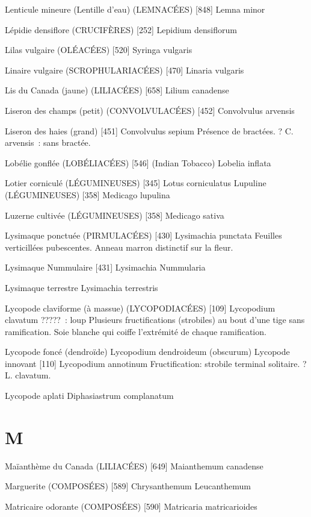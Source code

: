 Lenticule mineure (Lentille d’eau) (LEMNACÉES)  [848]
				Lemna minor


Lépidie densiflore (CRUCIFÈRES)  [252]
				Lepidium densiflorum

Lilas vulgaire (OLÉACÉES)  [520]
				Syringa vulgaris

Linaire vulgaire (SCROPHULARIACÉES)  [470]
				Linaria vulgaris

Lis du Canada (jaune) (LILIACÉES)  [658]
				Lilium canadense

Liseron des champs (petit) (CONVOLVULACÉES)  [452]
				Convolvulus arvensis

Liseron des haies (grand)  [451]
				Convolvulus sepium
Présence de bractées. ? C. arvensis : sans bractée.

Lobélie gonflée (LOBÉLIACÉES)  [546] (Indian Tobacco)
				Lobelia inflata

Lotier corniculé (LÉGUMINEUSES)  [345]
				Lotus corniculatus
Lupuline (LÉGUMINEUSES)  [358]
				Medicago lupulina

Luzerne cultivée (LÉGUMINEUSES)  [358]
				Medicago sativa

Lysimaque ponctuée (PIRMULACÉES)  [430]
				Lysimachia punctata
Feuilles verticillées pubescentes.
Anneau marron distinctif sur la fleur.

Lysimaque Nummulaire  [431]
				Lysimachia Nummularia

Lysimaque terrestre
				Lysimachia terrestris

Lycopode claviforme (à massue) (LYCOPODIACÉES)  [109]
				Lycopodium clavatum
????? : loup
Plusieurs fructifications (strobiles) au bout d’une tige sans ramification.
Soie blanche qui coiffe l’extrémité de chaque ramification.

Lycopode foncé (dendroïde) 
				Lycopodium dendroideum (obscurum)
Lycopode innovant  [110]
				Lycopodium annotinum
Fructification: strobile terminal solitaire.
? L. clavatum.

Lycopode aplati
				Diphasiastrum complanatum

\chapter*{M}

Maïanthème du Canada (LILIACÉES)  [649]
				Maianthemum canadense

Marguerite (COMPOSÉES)  [589]
				Chrysanthemum Leucanthemum

Matricaire odorante (COMPOSÉES)  [590]
				Matricaria matricarioides

